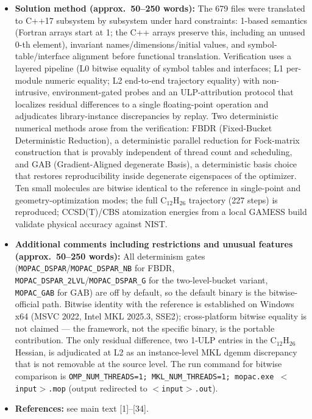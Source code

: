 \documentclass[preprint,12pt]{elsarticle}
\begin{document}
\begin{itemize}
\item \textbf{Solution method (approx.\ 50--250 words):} The 679 files were translated to C++17 subsystem by subsystem under hard constraints: 1-based semantics (Fortran arrays start at 1; the C++ arrays preserve this, including an unused 0-th element), invariant names/dimensions/initial values, and symbol-table/interface alignment before functional translation. Verification uses a layered pipeline (L0 bitwise equality of symbol tables and interfaces; L1 per-module numeric equality; L2 end-to-end trajectory equality) with non-intrusive, environment-gated probes and an ULP-attribution protocol that localizes residual differences to a single floating-point operation and adjudicates library-instance discrepancies by replay. Two deterministic numerical methods arose from the verification: FBDR (Fixed-Bucket Deterministic Reduction), a deterministic parallel reduction for Fock-matrix construction that is provably independent of thread count and scheduling, and GAB (Gradient-Aligned degenerate Basis), a deterministic basis choice that restores reproducibility inside degenerate eigenspaces of the optimizer. Ten small molecules are bitwise identical to the reference in single-point and geometry-optimization modes; the full C$_{12}$H$_{26}$ trajectory (227 steps) is reproduced; CCSD(T)/CBS atomization energies from a local GAMESS build validate physical accuracy against NIST.
\item \textbf{Additional comments including restrictions and unusual features (approx.\ 50--250 words):} All determinism gates (\texttt{MOPAC\_DSPAR}/\texttt{MOPAC\_DSPAR\_NB} for FBDR, \texttt{MOPAC\_DSPAR\_2LVL}/\texttt{MOPAC\_DSPAR\_G} for the two-level-bucket variant, \texttt{MOPAC\_GAB} for GAB) are off by default, so the default binary is the bitwise-official path. Bitwise identity with the reference is established on Windows x64 (MSVC 2022, Intel MKL 2025.3, SSE2); cross-platform bitwise equality is not claimed --- the framework, not the specific binary, is the portable contribution. The only residual difference, two 1-ULP entries in the C$_{12}$H$_{26}$ Hessian, is adjudicated at L2 as an instance-level MKL dgemm discrepancy that is not removable at the source level. The run command for bitwise comparison is \texttt{OMP\_NUM\_THREADS=1; MKL\_NUM\_THREADS=1; mopac.exe $<$input$>$.mop} (output redirected to \texttt{$<$input$>$.out}).
\item \textbf{References:} see main text [1]--[34].
\end{itemize}
\end{document}
